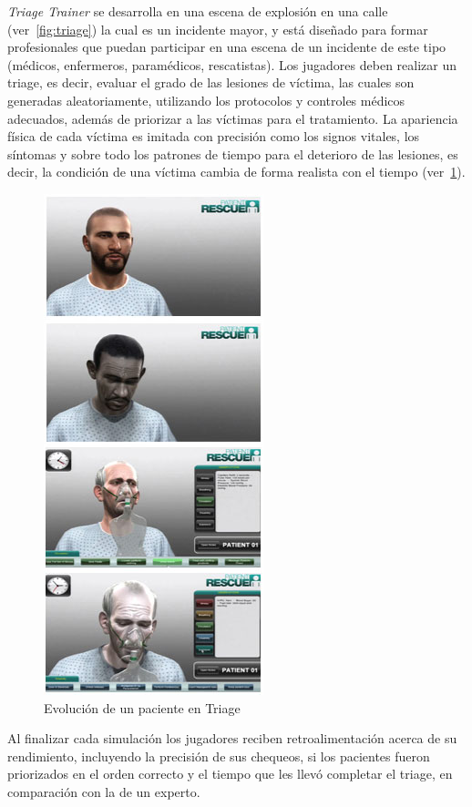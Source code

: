 \emph{Triage Trainer} se desarrolla en una escena de explosión en una calle
(ver~\ref{fig:triage}) la cual es un incidente mayor, y está diseñado para
formar profesionales que puedan participar en una escena de un incidente de este
tipo (médicos, enfermeros, paramédicos, rescatistas). Los jugadores deben
realizar un triage, es decir, evaluar el grado de las lesiones de víctima, las
cuales son generadas aleatoriamente, utilizando los protocolos y controles
médicos adecuados, además de priorizar a las víctimas para el tratamiento. La
apariencia física de cada víctima es imitada con precisión como los signos
vitales, los síntomas y sobre todo los patrones de tiempo para el deterioro de
las lesiones, es decir, la condición de una víctima cambia de forma realista con
el tiempo (ver~\ref{fig:triage_patient1}).

\begin{figure}[h!t]
\centering 
\includegraphics[scale=0.5]{tics/images/patient_side.jpg}
\caption{Evolución de un paciente en Triage}
\label{fig:triage_patient1}
\end{figure}

Al finalizar cada simulación los jugadores reciben retroalimentación acerca de
su rendimiento, incluyendo la precisión de sus chequeos, si los pacientes fueron
priorizados en el orden correcto y el tiempo que les llevó completar el triage,
en comparación con la de un experto.

